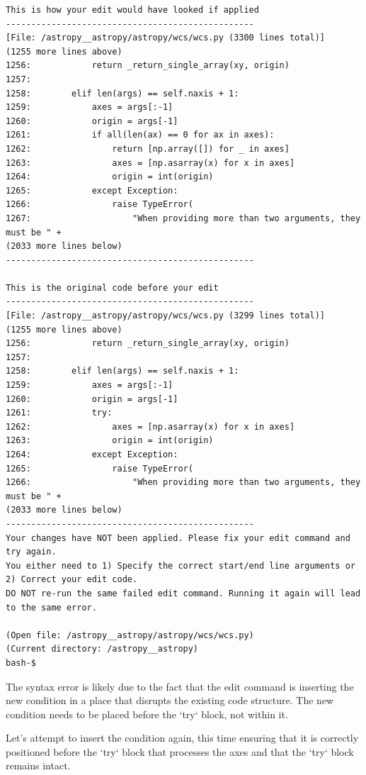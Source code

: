 {\begin{observationbox}
\begin{Verbatim}[breaklines=true, breakanywhere=true]
This is how your edit would have looked if applied
-------------------------------------------------
[File: /astropy__astropy/astropy/wcs/wcs.py (3300 lines total)]
(1255 more lines above)
1256:            return _return_single_array(xy, origin)
1257:
1258:        elif len(args) == self.naxis + 1:
1259:            axes = args[:-1]
1260:            origin = args[-1]
1261:            if all(len(ax) == 0 for ax in axes):
1262:                return [np.array([]) for _ in axes]
1263:                axes = [np.asarray(x) for x in axes]
1264:                origin = int(origin)
1265:            except Exception:
1266:                raise TypeError(
1267:                    "When providing more than two arguments, they must be " +
(2033 more lines below)
-------------------------------------------------

This is the original code before your edit
-------------------------------------------------
[File: /astropy__astropy/astropy/wcs/wcs.py (3299 lines total)]
(1255 more lines above)
1256:            return _return_single_array(xy, origin)
1257:
1258:        elif len(args) == self.naxis + 1:
1259:            axes = args[:-1]
1260:            origin = args[-1]
1261:            try:
1262:                axes = [np.asarray(x) for x in axes]
1263:                origin = int(origin)
1264:            except Exception:
1265:                raise TypeError(
1266:                    "When providing more than two arguments, they must be " +
(2033 more lines below)
-------------------------------------------------
Your changes have NOT been applied. Please fix your edit command and try again.
You either need to 1) Specify the correct start/end line arguments or 2) Correct your edit code.
DO NOT re-run the same failed edit command. Running it again will lead to the same error.

(Open file: /astropy__astropy/astropy/wcs/wcs.py)
(Current directory: /astropy__astropy)
bash-$
\end{Verbatim}
\end{observationbox}
\begin{agentbox}
The syntax error is likely due to the fact that the edit command is inserting the new condition in a place that disrupts the existing code structure. The new condition needs to be placed before the `try` block, not within it.



Let's attempt to insert the condition again, this time ensuring that it is correctly positioned before the `try` block that processes the axes and that the `try` block remains intact.




\end{agentbox}}
